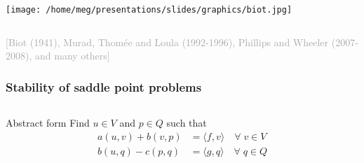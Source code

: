 \documentclass[10pt, mathserif, aspectratio=169, t]{beamer}
\newcommand{\foralls}{\forall \;}
\newcommand{\inner}[2]{\langle #1,  #2\rangle}
\newcommand{\refer}[1]{\begin{flushright}{\tiny \textcolor{darkgray}{[#1]}}\end{flushright}}
\begin{document}
\begin{frame}
\begin{columns}
\begin{column}{0.4\textwidth}
    \texttt{[image: /home/meg/presentations/slides/graphics/biot.jpg]}
    \hspace{1em}
  \end{column}
  \end{columns}
  \vspace{-1em}
  \refer{Biot (1941), Murad, Thom\'ee and Loula (1992-1996), Phillips and Wheeler (2007-2008), and many others}
\end{frame}

\begin{frame}
  \frametitle{Stability of saddle point problems}
  {\small
    \vspace{-1em}
    \begin{columns}[T]
    \begin{column}{0.5\textwidth}
      \begin{block}{Abstract form}
      Find $u \in V$ and $p \in Q$ such that
      \begin{align*}
        a(u, v) + b(v, p) &= \inner{f}{v} \quad \foralls v \in V \\
        b(u, q) - c(p, q) &= \inner{g}{q} \quad \foralls q \in Q 
      \end{align*}


\end{block}
\end{column}
\end{columns}}
\end{frame}
\end{document}
